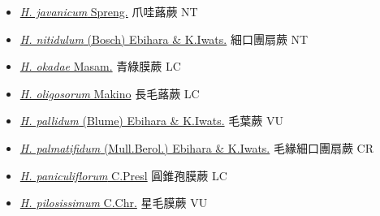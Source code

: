 \begin{itemize}
\begin{itemize}
        \item[] \href{http://www.theplantlist.org/tpl1.1/search?q=Hymenophyllum+javanicum}{\textit{H. javanicum} Spreng.}   爪哇蕗蕨 NT
        \item[] \href{http://www.theplantlist.org/tpl1.1/search?q=Hymenophyllum+nitidulum}{\textit{H. nitidulum} (Bosch) Ebihara \& K.Iwats.}     細口團扇蕨 NT
        \item[] \href{http://www.theplantlist.org/tpl1.1/search?q=Hymenophyllum+okadae}{\textit{H. okadae} Masam.}   青綠膜蕨 LC
        \item[] \href{http://www.theplantlist.org/tpl1.1/search?q=Hymenophyllum+oligosorum}{\textit{H. oligosorum} Makino}     長毛蕗蕨 LC
        \item[] \href{http://www.theplantlist.org/tpl1.1/search?q=Hymenophyllum+pallidum}{\textit{H. pallidum} (Blume) Ebihara \& K.Iwats.}     毛葉蕨 VU
        \item[] \href{http://www.theplantlist.org/tpl1.1/search?q=Hymenophyllum+palmatifidum}{\textit{H. palmatifidum} (Mull.Berol.) Ebihara \& K.Iwats.}   毛緣細口團扇蕨 CR
        \item[] \href{http://www.theplantlist.org/tpl1.1/search?q=Hymenophyllum+paniculiflorum}{\textit{H. paniculiflorum} C.Presl}   圓錐孢膜蕨 LC
        \item[] \href{http://www.theplantlist.org/tpl1.1/search?q=Hymenophyllum+pilosissimum}{\textit{H. pilosissimum} C.Chr.}   星毛膜蕨 VU

\end{itemize}
\end{itemize}
